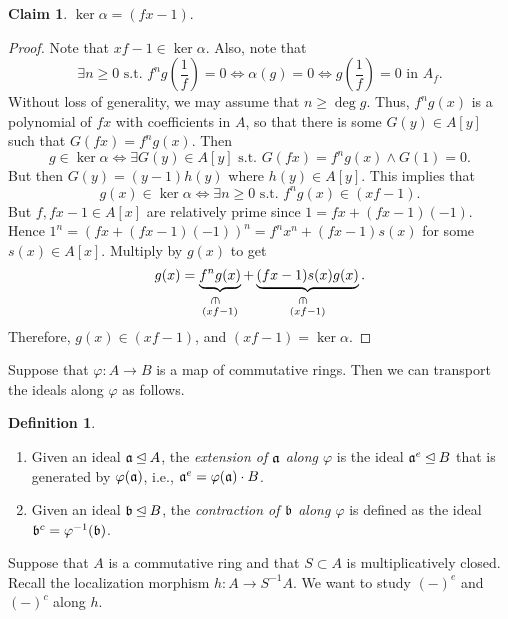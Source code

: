 \documentclass[10pt,letterpaper,cm]{nupset}
\theoremstyle{definition}
\newtheorem{definition}{Definition}[subsection]
\theoremstyle{theorem}
\newtheorem*{claim}{Claim}
\theoremstyle{remark}
\newcommand{\1}{\mathbf{1}}
\newcommand{\0}{\vec 0}
\begin{document}
\begin{claim}
$\ker{\alpha} = \left(fx-1\right)$.
\end{claim}
\begin{proof}
Note that $xf-1\in \ker{\alpha}$. Also, note that  $$ \exists n\geq 0 \text{ s.t. } f^ng\left(\frac{1}{f}\right)=0 \iff  \alpha(g) = 0 \iff  g\left(\frac{1}{f}\right) = 0 \text{ in } A_f.$$ Without loss of generality, we may assume that $n\geq \deg{g}$. Thus, $f^ng(x)$ is a polynomial of $fx$ with coefficients in $A$, so that there is some $G(y) \in A[y]$ such that $G(fx) = f^ng(x)$. Then $$g\in \ker{\alpha} \iff \exists G(y) \in A[y] \text{ s.t. } G(fx) = f^ng(x) \land G(1) =0.$$ But then $G(y) = \left(y-1\right)h(y)$ where $h(y) \in A[y]$. This implies that $$g(x) \in \ker{\alpha} \iff \exists n\geq 0 \text{ s.t. } f^ng(x) \in (xf -1).$$ But $f, fx-1 \in A[x]$ are relatively prime since $1= fx + \left(fx-1\right)({-1})$.  Hence $1^n = \left(fx + \left(fx-1\right)({-1})\right)^n = f^n x^n + (fx-1)s(x)$ for some $s(x) \in A[x]$. Multiply by $g(x)$ to get $$  g(x) = \underbrace{f^ng(x)}_{\overset{\invin}{\left(xf-1\right)}} + \underbrace{(fx -1)s(x)g(x)}_{\overset{\invin}{\left(xf-1\right)}}  .$$ Therefore, $g(x) \in \left(xf-1\right)$, and $\left(xf-1\right)=  \ker{\alpha}$. 
\end{proof}

Suppose that $\varphi : A \to B$ is a map of commutative rings. Then we can transport the ideals along $\varphi$ as follows. 

\begin{definition} $ $
\begin{enumerate}
\item
Given an ideal $\frak{a} \unlhd A$, the \textit{extension of $\frak{a}$ along $\varphi$} is the ideal $\frak{a}^e \unlhd B$ that is generated by $\varphi(\frak{a})$, i.e., $\frak{a}^e = \varphi(\frak{a}) \cdot B$.  
\item Given an ideal $\frak{b} \unlhd B$, the \textit{contraction of $\frak{b}$ along $\varphi$} is defined as the ideal $\frak{b}^c = \varphi^{-1}(\frak{b})$. 
\end{enumerate}
\end{definition}

Suppose that $A$ is a commutative ring and that $S\subset A$ is multiplicatively closed. Recall the localization morphism $h: A \to S^{-1}A$. We want to study $\left(-\right)^e$ and $\left(-\right)^c$ along $h$. 
\end{document}
